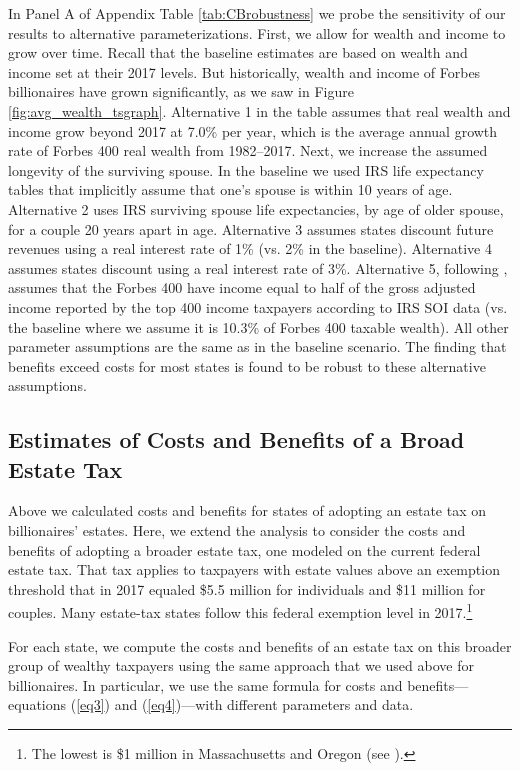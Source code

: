 \documentclass[12pt]{article}
\begin{document}
In Panel A of Appendix Table \ref{tab:CBrobustness} we probe the sensitivity of our results to alternative parameterizations. First, we allow for wealth and income to grow over time. Recall that the baseline estimates are based on wealth and income set at their 2017 levels. But historically, wealth and income of Forbes billionaires have grown significantly, as we saw in Figure \ref{fig:avg_wealth_tsgraph}.  Alternative 1  in the table assumes that real wealth and income grow beyond 2017 at 7.0\% per year, which is the average annual growth rate of Forbes 400 real wealth from 1982--2017. Next, we increase the assumed longevity of the surviving spouse. In the baseline we used IRS life expectancy tables that implicitly assume that one's spouse is within 10 years of age. Alternative 2 uses IRS surviving spouse life expectancies, by age of older spouse, for a couple 20 years apart in age. Alternative 3 assumes states discount future revenues using a real interest rate of 1\% (vs. 2\% in the baseline). Alternative 4 assumes states discount using a real interest rate of 3\%. Alternative 5, following \cite{saez-zucman:2019}, assumes that the Forbes 400 have income equal to half of the gross adjusted income reported by the top 400 income taxpayers according to IRS SOI data (vs. the baseline where we assume it is 10.3\% of Forbes 400 taxable wealth). All other parameter assumptions are the same as in the baseline scenario. The finding that benefits exceed costs for most states is found to be robust to these alternative assumptions. 
 

\subsection{Estimates of Costs and Benefits of a Broad Estate Tax}
\label{all}

Above we calculated costs and benefits for states of adopting an estate tax on  billionaires' estates. Here, we extend the analysis to consider the costs and benefits of adopting a broader estate tax, one modeled on the current federal estate tax. That tax applies to taxpayers with estate values above an exemption threshold that in 2017 equaled \$5.5 million for individuals and \$11 million for couples. Many estate-tax states follow this federal exemption level in 2017.\footnote{The lowest is \$1 million in Massachusetts and Oregon (see \cite{michael2018survey}).}

For each state, we compute the costs and benefits of an estate tax on this broader group of wealthy taxpayers using the same approach that we used above for billionaires. In particular, we use the same formula for costs and benefits---equations (\ref{eq3}) and (\ref{eq4})---with different parameters and data.     
\end{document}
